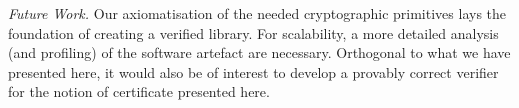 \documentclass{llncs}
\begin{document}
\smallskip\noindent\emph{Future Work.} Our axiomatisation of the
needed cryptographic primitives lays the foundation of creating a
verified library. For scalability, a more detailed analysis (and
profiling) of the software artefact are necessary. Orthogonal to
what we have presented here, it would also be of interest to develop
a provably correct verifier for the notion of certificate presented
here. 




%

%
%
\end{document}
